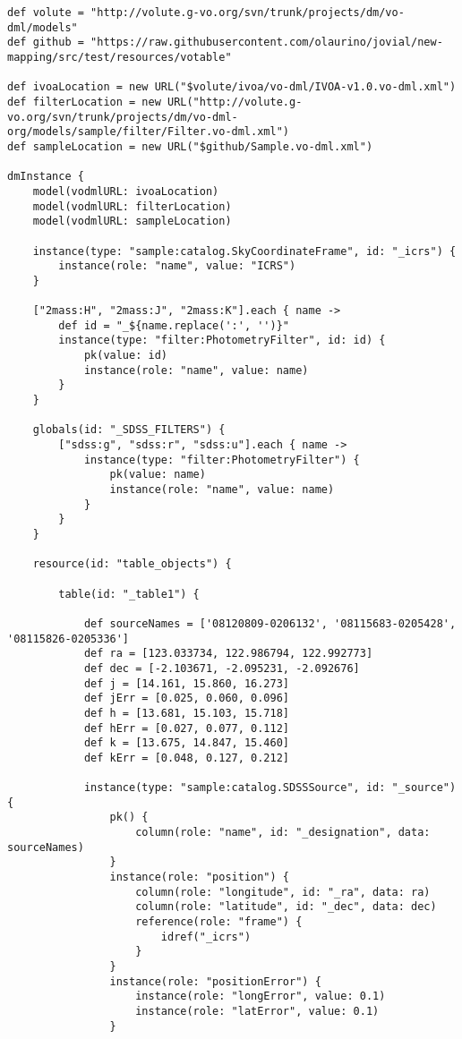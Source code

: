 \documentclass[11pt,a4paper]{ivoa}
\begin{document}
\begin{lstlisting}[label=lst:complex,caption=Full Example VO-DSL listing for complex mapping,frame=tb]
def volute = "http://volute.g-vo.org/svn/trunk/projects/dm/vo-dml/models"
def github = "https://raw.githubusercontent.com/olaurino/jovial/new-mapping/src/test/resources/votable"

def ivoaLocation = new URL("$volute/ivoa/vo-dml/IVOA-v1.0.vo-dml.xml")
def filterLocation = new URL("http://volute.g-vo.org/svn/trunk/projects/dm/vo-dml-org/models/sample/filter/Filter.vo-dml.xml")
def sampleLocation = new URL("$github/Sample.vo-dml.xml")

dmInstance {
    model(vodmlURL: ivoaLocation)
    model(vodmlURL: filterLocation)
    model(vodmlURL: sampleLocation)

    instance(type: "sample:catalog.SkyCoordinateFrame", id: "_icrs") {
        instance(role: "name", value: "ICRS")
    }

    ["2mass:H", "2mass:J", "2mass:K"].each { name ->
        def id = "_${name.replace(':', '')}"
        instance(type: "filter:PhotometryFilter", id: id) {
            pk(value: id)
            instance(role: "name", value: name)
        }
    }

    globals(id: "_SDSS_FILTERS") {
        ["sdss:g", "sdss:r", "sdss:u"].each { name ->
            instance(type: "filter:PhotometryFilter") {
                pk(value: name)
                instance(role: "name", value: name)
            }
        }
    }

    resource(id: "table_objects") {

        table(id: "_table1") {

            def sourceNames = ['08120809-0206132', '08115683-0205428', '08115826-0205336']
            def ra = [123.033734, 122.986794, 122.992773]
            def dec = [-2.103671, -2.095231, -2.092676]
            def j = [14.161, 15.860, 16.273]
            def jErr = [0.025, 0.060, 0.096]
            def h = [13.681, 15.103, 15.718]
            def hErr = [0.027, 0.077, 0.112]
            def k = [13.675, 14.847, 15.460]
            def kErr = [0.048, 0.127, 0.212]

            instance(type: "sample:catalog.SDSSSource", id: "_source") {
                pk() {
                    column(role: "name", id: "_designation", data: sourceNames)
                }
                instance(role: "position") {
                    column(role: "longitude", id: "_ra", data: ra)
                    column(role: "latitude", id: "_dec", data: dec)
                    reference(role: "frame") {
                        idref("_icrs")
                    }
                }
                instance(role: "positionError") {
                    instance(role: "longError", value: 0.1)
                    instance(role: "latError", value: 0.1)
                }


\end{lstlisting}
\end{document}

